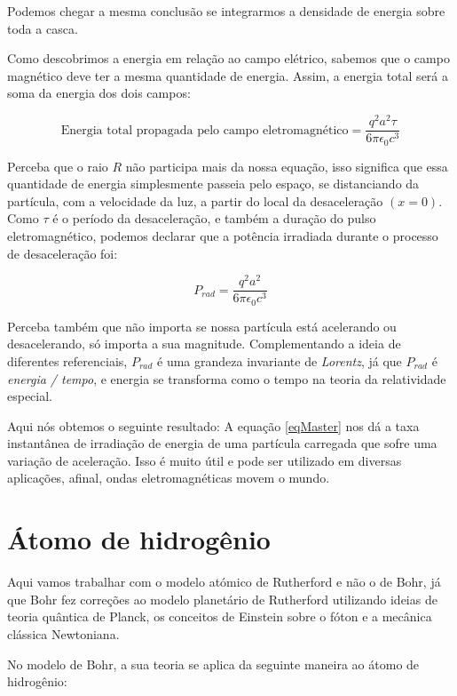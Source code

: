 \documentclass[12pt, letterpaper]{article}
\begin{document}
    Podemos chegar a mesma conclusão se integrarmos a densidade de energia sobre toda a casca.

    Como descobrimos a energia em relação ao campo elétrico, sabemos que o campo magnético deve ter a mesma quantidade de energia. Assim, a energia total será a soma da energia dos dois campos:

    \begin{equation} \label{eq7}
        \textrm{Energia total propagada pelo campo eletromagnético} =\frac{q^2a^2\tau}{6\pi\epsilon_0c^3}
    \end{equation}

    Perceba que o raio $R$ não participa mais da nossa equação, isso significa que essa quantidade de energia simplesmente passeia pelo espaço, se distanciando da partícula, com a velocidade da luz, a partir do local da desaceleração $(x = 0)$. Como $\tau$ é o período da desaceleração, e também a duração do pulso eletromagnético, podemos declarar que a potência irradiada durante o processo de desaceleração foi:

    \begin{equation} \label{eqMaster}
        P_{rad} = \frac{q^2a^2}{6\pi\epsilon_0c^3}
    \end{equation}

    Perceba também que não importa se nossa partícula está acelerando ou desacelerando, só importa a sua magnitude. Complementando a ideia de diferentes referenciais, $P_{rad}$ é uma grandeza invariante de \textit{Lorentz}, já que $P_{rad}$ é \textit{energia / tempo}, e energia se transforma como o tempo na teoria da relatividade especial.

    Aqui nós obtemos o seguinte resultado: A equação \ref{eqMaster} nos dá a taxa instantânea de irradiação de energia de uma partícula carregada que sofre uma variação de aceleração. Isso é muito útil e pode ser utilizado em diversas aplicações, afinal, ondas eletromagnéticas movem o mundo.

\newpage
\section{Átomo de hidrogênio}

    Aqui vamos trabalhar com o modelo atómico de Rutherford e não o de Bohr, já que Bohr fez correções ao modelo planetário de Rutherford utilizando ideias de teoria quântica de Planck, os conceitos de Einstein sobre o fóton e a mecânica clássica Newtoniana.

    No modelo de Bohr, a sua teoria se aplica da seguinte maneira ao átomo de hidrogênio:
\end{document}
